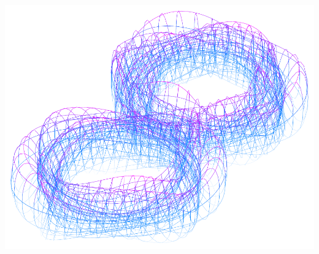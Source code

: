\documentclass[11pt,openany]{article}
\begin{document}
\begin{center}
\begin{minipage}{.32\textwidth}
	\includegraphics[scale=.35]{../tikz/grad-math-tikz-pdf/double-torus3.pdf}
\end{minipage}
\end{center}
\vfill
\vfill
\end{document}
